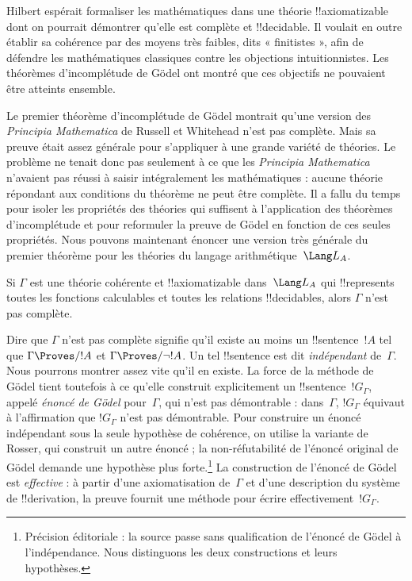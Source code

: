 \documentclass[../../../include/open-logic-section]{subfiles}
\begin{document}


Hilbert espérait formaliser les mathématiques dans une théorie
!!{axiomatizable} dont on pourrait démontrer qu'elle est complète
et !!{decidable}. Il voulait en outre établir sa cohérence par des
moyens très faibles, dits « finitistes », afin de défendre les
mathématiques classiques contre les objections intuitionnistes.
Les théorèmes d'incomplétude de Gödel ont montré que ces objectifs
ne pouvaient être atteints ensemble.

Le premier théorème d'incomplétude de Gödel montrait qu'une version
des \emph{Principia Mathematica} de Russell et Whitehead n'est pas
complète. Mais sa preuve était assez générale pour s'appliquer à
une grande variété de théories. Le problème ne tenait donc pas
seulement à ce que les \emph{Principia Mathematica} n'avaient pas
réussi à saisir intégralement les mathématiques : aucune théorie
répondant aux conditions du théorème ne peut être complète. Il a
fallu du temps pour isoler les propriétés des théories qui suffisent
à l'application des théorèmes d'incomplétude et pour reformuler la
preuve de Gödel en fonction de ces seules propriétés. Nous pouvons
maintenant énoncer une version très générale du premier théorème
pour les théories du langage arithmétique~$\Lang L_A$.

\begin{thm}
Si $\Gamma$ est une théorie cohérente et !!{axiomatizable}
dans~$\Lang L_A$ qui !!{represents} toutes les fonctions calculables
et toutes les relations !!{decidable}s, alors $\Gamma$ n'est pas
complète.
\end{thm}

Dire que $\Gamma$ n'est pas complète signifie qu'il existe au moins
un !!{sentence}~$!A$ tel que $\Gamma\Proves/ !A$ et
$\Gamma\Proves/\lnot !A$. Un tel !!{sentence} est dit
\emph{indépendant} de~$\Gamma$. Nous pourrons montrer assez vite
qu'il en existe. La force de la méthode de Gödel tient toutefois à
ce qu'elle construit explicitement un !!{sentence}~$!G_\Gamma$,
appelé \emph{énoncé de Gödel} pour~$\Gamma$, qui n'est pas
démontrable : dans~$\Gamma$, $!G_\Gamma$ équivaut à l'affirmation
que $!G_\Gamma$ n'est pas démontrable. Pour construire un énoncé indépendant
sous la seule hypothèse de cohérence, on utilise la variante
de Rosser, qui construit un autre énoncé ; la non-réfutabilité de l'énoncé original de Gödel demande une hypothèse
plus forte.\footnote{Précision éditoriale : la source passe sans qualification de l'énoncé de Gödel à l'indépendance. Nous distinguons les deux constructions et leurs hypothèses.} La construction de l'énoncé de Gödel est \emph{effective} : à partir d'une
axiomatisation de~$\Gamma$ et d'une description du système de
!!{derivation}, la preuve fournit une méthode pour écrire
effectivement~$!G_\Gamma$.
\end{document}
